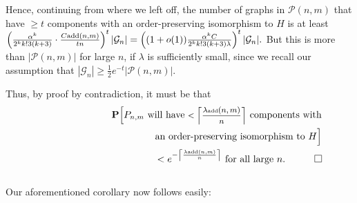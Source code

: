 \documentclass{article}
\newtheorem{Proof of Theorem}{Proof of Theorem}
\begin{document}
Hence, continuing from where we left off,
the number of graphs in $\mathcal{P}(n,m)$ that have $\geq t$ components 
with an order-preserving isomorphism to $H$ is at least 
$
\left( \frac{\alpha^{k}}{2^{k}k!3(k+3)} \cdot \frac{C\textrm{\scriptsize{add}}(n,m)}{tn} \right)^{t} |\mathcal{G}_{n}| 
= \left( (1+o(1)) \frac{\alpha^{k}C}{2^{k}k!3(k+3)\lambda} \right)^{t} |\mathcal{G}_{n}|.
$ 
But this is more than $|\mathcal{P}(n,m)|$ for large $n$,
if $\lambda$ is sufficiently small, 
since we recall our assumption that
$|\mathcal{G}_{n}| \geq \frac{1}{2} e^{-t} |\mathcal{P}(n,m)|$. 

Thus, by proof by contradiction, it must be that
\begin{eqnarray*}
& & \mathbf{P}\Big[
\textrm{$P_{n,m}$
will have \footnotesize{$< \left \lceil \frac{\lambda \textrm{\tiny{add}}(n,m)}{n} \right \rceil$}} 
\textrm{ components with} \\
& & \phantom{wwwwww}\textrm{an order-preserving isomorphism to $H$}\Big] \\
& & \phantom{wwwwwwwwwwwwwww}
< e^{- \left \lceil \frac{\lambda \textrm{\tiny{add}}(n,m)}{n} \right \rceil} \textrm{ for all large $n$}.
\phantom{qwerty}
\setlength{\unitlength}{.25cm}
\begin{picture}(1,1)
\put(0,0){\line(1,0){1}}
\put(0,0){\line(0,1){1}}
\put(1,1){\line(-1,0){1}}
\put(1,1){\line(0,-1){1}}
\end{picture}
\end{eqnarray*} \\















Our aforementioned corollary now follows easily:
\end{document}
